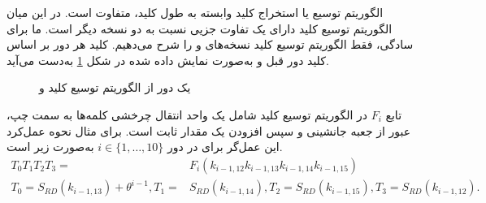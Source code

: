 الگوریتم توسیع یا استخراج کلید وابسته به طول کلید،  متفاوت است. در این میان الگوریتم توسیع کلید 
دارای یک تفاوت جزیی نسبت به دو نسخه دیگر است. ما برای سادگی، فقط الگوریتم توسیع کلید نسخه‌های 
و 
را  شرح می‌دهیم.   کلید هر دور بر اساس کلید دور قبل و به‌صورت نمایش داده شده در شکل 
\ref{fig:AES_keyschedule}
 به‌دست می‌آید. 
\begin{figure}[h]
\begin{center}

\caption{یک دور از الگوریتم توسیع  کلید  
	و 
	}
\label{fig:AES_keyschedule}
\end{center}
\end{figure}
تابع 
$F_{i}$
در الگوریتم توسیع کلید شامل  یک واحد انتقال چرخشی کلمه‌ها به سمت چپ، عبور از جعبه جانشینی و سپس افزودن یک مقدار ثابت است. برای مثال نحوه عمل‌کرد این عمل‌گر برای 
در دور 
$i\in\{1,\ldots,10\}$
به‌صورت زیر است. 
\begin{align*}
T_{0}T_{1}T_{2}T_{3} =& F_{i}(k_{i-1,12}k_{i-1,13}k_{i-1,14}k_{i-1,15})\\
T_{0} = S_{RD}(k_{i-1,13}) + \theta^{i-1}, T_{1} =& S_{RD}(k_{i-1,14}), T_{2} = S_{RD}(k_{i-1,15}), T_{3} = S_{RD}(k_{i-1,12}).
\end{align*}
